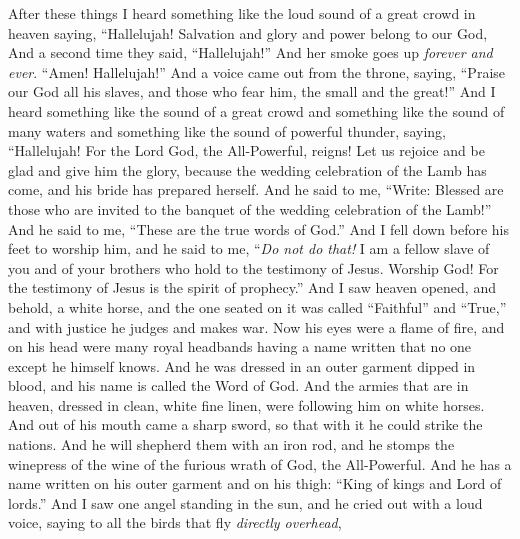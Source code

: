 \begin{biblechapter} %
 After these things I heard something like the loud sound of a great crowd in heaven saying,
\verse “Hallelujah! 
Salvation and glory and power belong to our God,
\verse And a second time they said, “Hallelujah!”
\verse And her smoke goes up \textit{forever and ever}. “Amen! Hallelujah!”
\verse And a voice came out from the throne, saying, “Praise our God 
all his slaves, 
and those who fear him, 
the small and the great!”
 And I heard something like the sound of a great crowd and something like the sound of many waters and something like the sound of powerful thunder, saying,
\verse “Hallelujah! 
For the Lord God, the All-Powerful, reigns!
\verse Let us rejoice and be glad 
and give him the glory, 
because the wedding celebration of the Lamb has come, 
and his bride has prepared herself.
\verse And he said to me, “Write: Blessed are those who are invited to the banquet of the wedding celebration of the Lamb!” And he said to me, “These are the true words of God.”
\verse And I fell down before his feet to worship him, and he said to me, “\textit{Do not do that!} I am a fellow slave of you and of your brothers who hold to the testimony of Jesus. Worship God! For the testimony of Jesus is the spirit of prophecy.”
 And I saw heaven opened, and behold, a white horse, and the one seated on it was called “Faithful” and “True,” and with justice he judges and makes war.
\verse Now his eyes were a flame of fire, and on his head were many royal headbands having a name written that no one except he himself knows.
\verse And he was dressed in an outer garment dipped in blood, and his name is called the Word of God.
\verse And the armies that are in heaven, dressed in clean, white fine linen, were following him on white horses.
\verse And out of his mouth came a sharp sword, so that with it he could strike the nations. And he will shepherd them with an iron rod, and he stomps the winepress of the wine of the furious wrath of God, the All-Powerful.
\verse And he has a name written on his outer garment and on his thigh: “King of kings and Lord of lords.”
\verse And I saw one angel standing in the sun, and he cried out with a loud voice, saying to all the birds that fly \textit{directly overhead},

\end{biblechapter}
